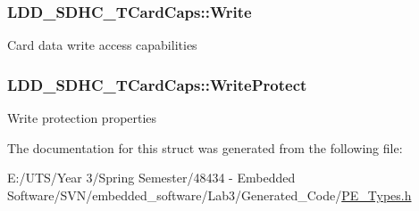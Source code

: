 \subsubsection[{Write}]{ L\+D\+D\+\_\+\+S\+D\+H\+C\+\_\+\+T\+Card\+Caps\+::\+Write}\label{struct_l_d_d___s_d_h_c___t_card_caps_ad28c378a6b9edfbd726a8019d5c8be79}
Card data write access capabilities \hypertarget{struct_l_d_d___s_d_h_c___t_card_caps_a32ecbbace3b435b1d70a57b09bf9662b}{}
\subsubsection[{Write\+Protect}]{ L\+D\+D\+\_\+\+S\+D\+H\+C\+\_\+\+T\+Card\+Caps\+::\+Write\+Protect}\label{struct_l_d_d___s_d_h_c___t_card_caps_a32ecbbace3b435b1d70a57b09bf9662b}
Write protection properties 

The documentation for this struct was generated from the following file\+:\begin{DoxyCompactItemize}
\item 
E\+:/\+U\+T\+S/\+Year 3/\+Spring Semester/48434 -\/ Embedded Software/\+S\+V\+N/embedded\+\_\+software/\+Lab3/\+Generated\+\_\+\+Code/\hyperlink{_p_e___types_8h}{P\+E\+\_\+\+Types.\+h}\end{DoxyCompactItemize}

